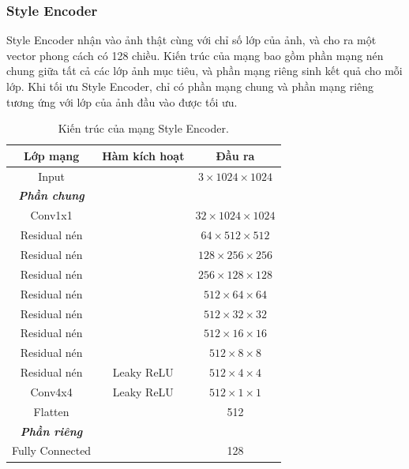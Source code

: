 \documentclass[12pt]{extreport}
\begin{document}
\subsubsection{Style Encoder}

Style Encoder nhận vào ảnh thật cùng với chỉ số lớp của ảnh, và cho ra một vector phong cách có 128 chiều. Kiến trúc của mạng bao gồm phần mạng nén chung giữa tất cả các lớp ảnh mục tiêu, và phần mạng riêng sinh kết quả cho mỗi lớp. Khi tối ưu Style Encoder, chỉ có phần mạng chung và phần mạng riêng tương ứng với lớp của ảnh đầu vào được tối ưu.

\begin{table}[H]
    \centering
    \begin{tabular}{c c c}
        Lớp mạng        & Hàm kích hoạt & Đầu ra                         \\
        \hline
        Input           &               & $ 3 \times 1024 \times 1024 $  \\
        \hline
        \textbf{\textit{Phần chung}}                                     \\
        Conv1x1         &               & $ 32 \times 1024 \times 1024 $ \\
        Residual nén    &               & $ 64 \times 512 \times 512 $   \\
        Residual nén    &               & $ 128 \times 256 \times 256 $  \\
        Residual nén    &               & $ 256 \times 128 \times 128 $  \\
        Residual nén    &               & $ 512 \times 64 \times 64 $    \\
        Residual nén    &               & $ 512 \times 32 \times 32 $    \\
        Residual nén    &               & $ 512 \times 16 \times 16 $    \\
        Residual nén    &               & $ 512 \times 8 \times 8 $      \\
        Residual nén    & Leaky ReLU    & $ 512 \times 4 \times 4 $      \\
        Conv4x4         & Leaky ReLU    & $ 512 \times 1 \times 1 $      \\
        Flatten         &               & 512                            \\
        \hline
        \textbf{\textit{Phần riêng}}                                     \\
        Fully Connected &               & 128
    \end{tabular}
    \caption{Kiến trúc của mạng Style Encoder.}
\end{table}
\end{document}
